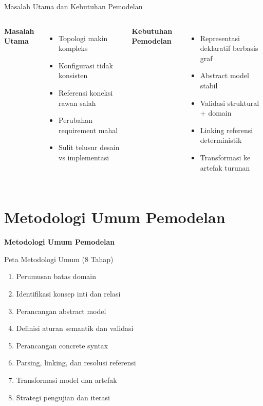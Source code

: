 \documentclass[aspectratio=169, table]{beamer}
\begin{document}
\begin{frame}{Masalah Utama dan Kebutuhan Pemodelan}
\vspace{4pt}
\begin{columns}[T]
\textbf{Masalah Utama}
\begin{itemize}
  \item Topologi makin kompleks
  \item Konfigurasi tidak konsisten
  \item Referensi koneksi rawan salah
  \item Perubahan requirement mahal
  \item Sulit telusur desain vs implementasi
\end{itemize}

\textbf{Kebutuhan Pemodelan}
\begin{itemize}
  \item Representasi deklaratif berbasis graf
  \item Abstract model stabil
  \item Validasi struktural + domain
  \item Linking referensi deterministik
  \item Transformasi ke artefak turunan
\end{itemize}
\end{columns}
\end{frame}

\section{Metodologi Umum Pemodelan}
\begin{frame}{\hfill}
	\centering
	\Huge{\textbf{Metodologi Umum Pemodelan}}
\end{frame}

\begin{frame}{Peta Metodologi Umum (8 Tahap)}
\vspace{4pt}
\begin{enumerate}
  \item Perumusan batas domain
  \item Identifikasi konsep inti dan relasi
  \item Perancangan abstract model
  \item Definisi aturan semantik dan validasi
  \item Perancangan concrete syntax
  \item Parsing, linking, dan resolusi referensi
  \item Transformasi model dan artefak
  \item Strategi pengujian dan iterasi
\end{enumerate}
\end{frame}
\end{document}
